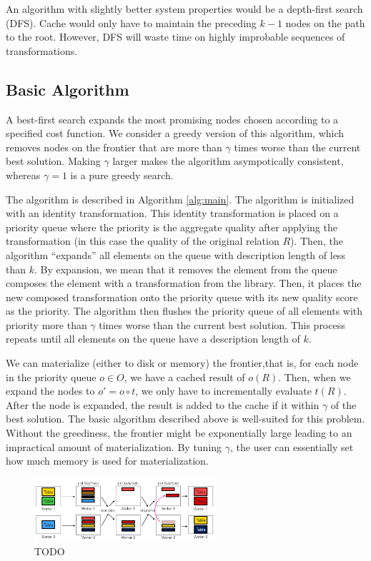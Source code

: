 An algorithm with slightly better system properties would be a depth-first search (DFS).
Cache would only have to maintain the preceding $k-1$ nodes on the path to the root.
However, DFS will waste time on highly improbable sequences of transformations.

\subsection{Basic Algorithm}
A best-first search expands the most promising nodes chosen according to a specified cost function.
We consider a greedy version of this algorithm, which removes nodes on the frontier that are more than $\gamma$ times worse than the current best solution.
Making $\gamma$ larger makes the algorithm asympotically consistent, whereas $\gamma=1$ is a pure greedy search.

The algorithm is described in Algorithm \ref{alg:main}.
The algorithm is initialized with an identity transformation. This identity transformation is placed on a priority queue where the priority is the aggregate quality after applying the transformation (in this case the quality of the original relation $R$).
Then, the algorithm ``expands'' all elements on the queue with description length of less than $k$.
By expansion, we mean that it removes the element from the queue composes the element with a transformation from the library.
Then, it places the new composed transformation onto the priority queue with its new quality score as the priority.
The algorithm then flushes the priority queue of all elements with priority more than $\gamma$ times worse than the current best solution.
This process repeats until all elements on the queue have a description length of $k$.

We can materialize (either to disk or memory) the frontier,that is, for each node in the priority queue $o \in O$, we have a cached result of $o(R)$. 
Then, when we expand the nodes to $o' = o \circ t$, we only have to incrementally evaluate $t(R)$.
After the node is expanded, the result is added to the cache if it within $\gamma$ of the best solution.
The basic algorithm described above is well-suited for this problem.
Without the greediness, the frontier might be exponentially large leading to an impractical amount of materialization.
By tuning $\gamma$, the user can essentially set how much memory is used for materialization.

\begin{figure}
    \centering
    \includegraphics[width=0.6\textwidth]{figures/distributed.png}
    \caption{TODO}
    \label{fig:my_label}
\end{figure}

